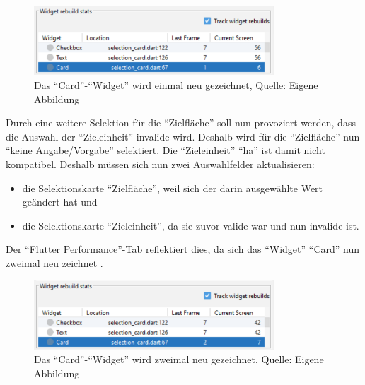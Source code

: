 \begin{figure}[ht]
  \centering
  \ifIncludeFigures
  \includegraphics[width=0.8\textwidth]{Inhalt/Hauptteil/Implementierung/Schritt-5/1rebuild.png}
  \fi
  \caption[Das \enquote{Card}-\enquote{Widget} wird einmal neu gezeichnet]{Das \enquote{Card}-\enquote{Widget} wird einmal neu gezeichnet, Quelle: Eigene Abbildung}
  
  \label{fig:Schritt5_1rebuild}
\end{figure}%

Durch eine weitere Selektion für die \enquote{Zielfläche} soll nun provoziert werden, dass die Auswahl der  \enquote{Zieleinheit} invalide wird.
Deshalb wird für die \enquote{Zielfläche} nun \enquote{keine Angabe/Vorgabe} selektiert.
Die \enquote{Zieleinheit} \enquote{ha} ist damit nicht kompatibel.
Deshalb müssen sich nun zwei Auswahlfelder aktualisieren:
\begin{itemize}[topsep=0pt,itemsep=-1ex,partopsep=1ex,parsep=1ex]
  \item die Selektionskarte \enquote{Zielfläche}, weil sich der darin ausgewählte Wert geändert hat und
  \item die Selektionskarte \enquote{Zieleinheit}, da sie zuvor valide war und nun invalide ist.
\end{itemize}

Der \enquote{Flutter Performance}-Tab reflektiert dies,
da sich das \enquote{Widget} \enquote{Card} nun zweimal neu zeichnet \Abb{\ref{fig:Schritt5_2rebuilds}}.

\begin{figure}[ht]
  \centering
  \ifIncludeFigures
  \includegraphics[width=0.8\textwidth]{Inhalt/Hauptteil/Implementierung/Schritt-5/2rebuilds.png}
  \fi
  \caption[Das \enquote{Card}-\enquote{Widget} wird zweimal neu gezeichnet]{Das \enquote{Card}-\enquote{Widget} wird zweimal neu gezeichnet, Quelle: Eigene Abbildung}
  
  \label{fig:Schritt5_2rebuilds}
\end{figure}%